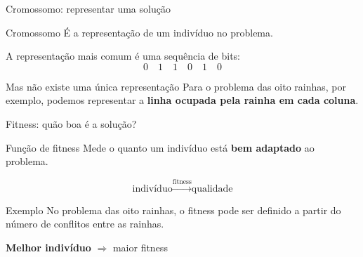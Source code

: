 \documentclass[xcolor=dvipsnames,table]{beamer}
\begin{document}
    \begin{frame}{Cromossomo: representar uma solução}

    \begin{block}{Cromossomo}
        É a representação de um indivíduo no problema.

        \medskip

        A representação mais comum é uma sequência de bits:
        \[
        0\quad 1\quad 1\quad 0\quad 1\quad 0
        \]
    \end{block}

    \begin{block}{Mas não existe uma única representação}
        Para o problema das oito rainhas, por exemplo, podemos
        representar a \textbf{linha ocupada pela rainha em cada coluna}.
    \end{block}

    \begin{center}
        \Large
    \end{center}

\end{frame}

\begin{frame}{Fitness: quão boa é a solução?}

    \begin{block}{Função de fitness}
        Mede o quanto um indivíduo está \textbf{bem adaptado}
        ao problema.
    \end{block}

    \begin{center}
        \Large
        \[
        \boxed{\text{indivíduo} \xrightarrow{\text{fitness}}
        \text{qualidade}}
        \]
    \end{center}

    \begin{block}{Exemplo}
        No problema das oito rainhas, o fitness pode ser definido
        a partir do número de conflitos entre as rainhas.
    \end{block}

    \begin{center}
        \textbf{Melhor indivíduo} $\Rightarrow$ maior fitness
    \end{center}

\end{frame}
\end{document}
